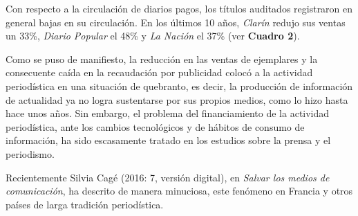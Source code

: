 {%

Con respecto a la circulación de diarios pagos, los títulos auditados registraron en general bajas en su circulación. En los últimos 10 años, \emph{Clarín} redujo sus ventas un 33\%, \emph{Diario Popular} el 48\% y \emph{La Nación} el 37\% (ver \textbf{Cuadro 2}).

Como se puso de manifiesto, la reducción en las ventas de ejemplares y la consecuente caída en la recaudación por publicidad colocó a la actividad periodística en una situación de quebranto, es decir, la producción de información de actualidad ya no logra sustentarse por sus propios medios, como lo hizo hasta hace unos años. Sin embargo, el problema del financiamiento de la actividad periodística, ante los cambios tecnológicos y de hábitos de consumo de información, ha sido escasamente tratado en los estudios sobre la prensa y el periodismo.

Recientemente Silvia Cagé (2016: 7, versión digital), en \emph{Salvar los medios de comunicación}, ha descrito de manera minuciosa, este fenómeno en Francia y otros países de larga tradición periodística.

}
